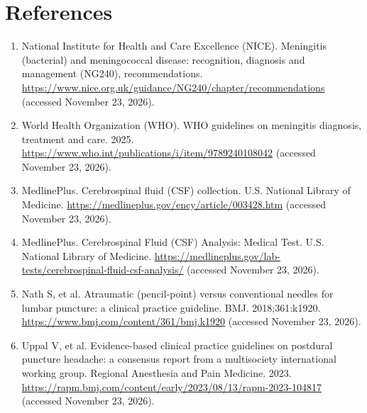 \section*{References}
\begin{enumerate}
  \item National Institute for Health and Care Excellence (NICE). Meningitis (bacterial) and meningococcal disease: recognition, diagnosis and management (NG240), recommendations. \url{https://www.nice.org.uk/guidance/NG240/chapter/recommendations} (accessed November 23, 2026).
  \item World Health Organization (WHO). WHO guidelines on meningitis diagnosis, treatment and care. 2025. \url{https://www.who.int/publications/i/item/9789240108042} (accessed November 23, 2026).
  \item MedlinePlus. Cerebrospinal fluid (CSF) collection. U.S. National Library of Medicine. \url{https://medlineplus.gov/ency/article/003428.htm} (accessed November 23, 2026).
  \item MedlinePlus. Cerebrospinal Fluid (CSF) Analysis: Medical Test. U.S. National Library of Medicine. \url{https://medlineplus.gov/lab-tests/cerebrospinal-fluid-csf-analysis/} (accessed November 23, 2026).
  \item Nath S, et al. Atraumatic (pencil-point) versus conventional needles for lumbar puncture: a clinical practice guideline. BMJ. 2018;361:k1920. \url{https://www.bmj.com/content/361/bmj.k1920} (accessed November 23, 2026).
  \item Uppal V, et al. Evidence-based clinical practice guidelines on postdural puncture headache: a consensus report from a multisociety international working group. Regional Anesthesia and Pain Medicine. 2023. \url{https://rapm.bmj.com/content/early/2023/08/13/rapm-2023-104817} (accessed November 23, 2026).
\end{enumerate}

\clearpage
